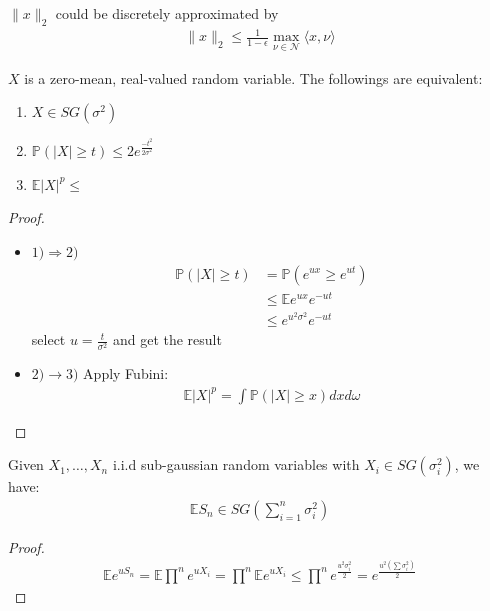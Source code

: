 \begin{lemma}
	$\|x\|_2$ could be discretely approximated by
	\begin{align*}
		\|x\|_2 \leq \frac{1}{1 - \epsilon} \max_{ \nu \in \mathcal{N}} \langle x, \nu \rangle
	\end{align*}
\end{lemma}

\begin{theorem}
$X$ is a zero-mean, real-valued random variable. The followings are equivalent:
\begin{enumerate}
	\item $X \in SG(\sigma^2)$
	\item $\mathbb{P}(|X| \geq t) \leq 2e^{\frac{-t^2}{2\sigma^2}}$
	\item $\mathbb{E} |X|^p \leq $
\end{enumerate}	
\end{theorem}
\begin{proof}
$\quad$
\begin{itemize}
	\item $1)\Rightarrow 2)$
	\begin{align*}
		\mathbb{P}(|X| \geq t) &= \mathbb{P}(e^{ux} \geq e^{ut})\\
		&\leq \mathbb{E}e^{ux} e^{-ut}\\
		&\leq e^{u^2 \sigma^2} e^{-ut}
	\end{align*}
	select $u = \frac{t}{\sigma^2}$ and get the result
	\item $2) \rightarrow 3)$ Apply Fubini:
	\begin{align*}
		\mathbb{E}|X|^p = \int \mathbb{P}(|X| \geq x) dxd\omega
	\end{align*}
\end{itemize}
\end{proof}

\begin{lemma}
	Given $X_1, \dots, X_n$ i.i.d sub-gaussian random variables with $X_i \in SG(\sigma_i^2)$, we have:
	\begin{align*}
		\mathbb{E}S_n \in SG(\sum_{i = 1}^n \sigma_i^2)
	\end{align*}
\end{lemma}
\begin{proof}
\begin{align*}
	\mathbb{E}e^{u S_n} = \mathbb{E}\prod^n e^{uX_i} = \prod^n \mathbb{E}e^{uX_i} \leq \prod^n e^{\frac{u^2 \sigma_i^2}{2}} = e^{\frac{u^2(\sum \sigma_i^2)}{2}}
\end{align*}
\end{proof}

